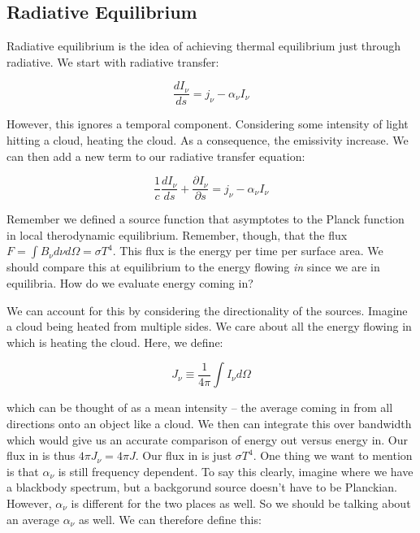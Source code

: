 \documentclass{article}
\begin{document}
\subsection{Radiative Equilibrium}

Radiative equilibrium is the idea of achieving thermal equilibrium just through radiative. We start with radiative transfer:

\begin{equation}
    \dfrac{dI_\nu}{ds} = j_\nu - \alpha_\nu I_\nu
\end{equation}

However, this ignores a temporal component. Considering some intensity of light hitting a cloud, heating the cloud. As a consequence, the emissivity increase. We can then add a new term to our radiative transfer equation:

\begin{equation}
    \boxed{\frac{1}{c}\dfrac{dI_\nu}{ds} + \frac{\partial I_\nu}{\partial s} = j_\nu - \alpha_\nu I_\nu}
\end{equation}

Remember we defined a source function that asymptotes to the Planck function in local therodynamic equilibrium. Remember, though, that the flux $F = \int B_\nu d\nu d \Omega = \sigma T^4$. This flux is the energy per time per surface area. We should compare this at equilibrium to the energy flowing \textit{in} since we are in equilibria. How do we evaluate energy coming in?

We can account for this by considering the directionality of the sources. Imagine a cloud being heated from multiple sides. We care about all the energy flowing in which is heating the cloud. Here, we define:

\begin{equation}
    J_\nu \equiv \frac{1}{4\pi}\int I_\nu d\Omega
\end{equation}

which can be thought of as a mean intensity -- the average coming in from all directions onto an object like a cloud. We then can integrate this over bandwidth which would give us an accurate comparison of energy out versus energy in. Our flux in is thus $4\pi J_\nu = 4\pi J$. Our flux in is just $\sigma T^4$. One thing we want to mention is that $\alpha_\nu$ is still frequency dependent. To say this clearly, imagine where we have a blackbody spectrum, but a backgorund source doesn't have to be Planckian. However, $\alpha_\nu$ is different for the two places as well. So we should be talking about an average $\alpha_\nu$ as well. We can therefore define this:
\end{document}
